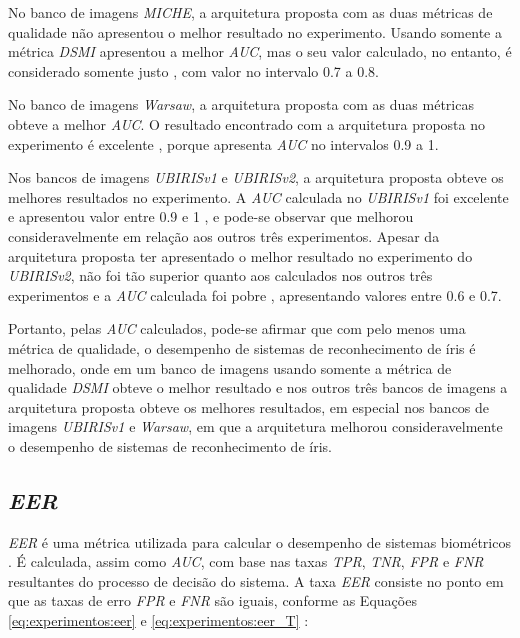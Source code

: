 \par No banco de imagens \textit{MICHE}, a arquitetura proposta com as duas métricas de qualidade não apresentou o melhor resultado no experimento. Usando somente a métrica \textit{\acrshort{DSMI}} apresentou a melhor \textit{\acrshort{AUC}}, mas o seu valor calculado, no entanto, é considerado somente justo \cite{aucROC}, com valor no intervalo 0.7 a 0.8.

\par No banco de imagens \textit{\acrshort{Warsaw}}, a arquitetura proposta com as duas métricas obteve a melhor \textit{\acrshort{AUC}}. O resultado encontrado com a arquitetura proposta no experimento é excelente \cite{aucROC}, porque apresenta \textit{\acrshort{AUC}} no intervalos 0.9 a 1.

\par Nos bancos de imagens \textit{UBIRISv1} e \textit{UBIRISv2}, a arquitetura proposta obteve os melhores resultados no experimento. A \textit{\acrshort{AUC}} calculada no \textit{UBIRISv1} foi excelente e apresentou valor entre 0.9 e 1 \cite{aucROC}, e pode-se observar que melhorou consideravelmente em relação aos outros três experimentos. Apesar da arquitetura proposta ter apresentado o melhor resultado no experimento do \textit{UBIRISv2}, não foi tão superior quanto aos calculados nos outros três experimentos e a \textit{\acrshort{AUC}} calculada foi pobre \cite{aucROC}, apresentando valores entre 0.6 e 0.7.

\par Portanto, pelas \textit{\acrshort{AUC}} calculados, pode-se afirmar que com pelo menos uma métrica de qualidade, o desempenho de sistemas de reconhecimento de íris é melhorado, onde em um banco de imagens usando somente a métrica de qualidade \textit{\acrshort{DSMI}} obteve o melhor resultado e nos outros três bancos de imagens a arquitetura proposta obteve os melhores resultados, em especial nos bancos de imagens \textit{UBIRISv1} e \textit{\acrshort{Warsaw}}, em que a arquitetura melhorou consideravelmente o desempenho de sistemas de reconhecimento de íris. 

\FloatBarrier

\subsection{\textit{\acrfull{EER}}} \label{sec:experimentos:eer}

\par \textit{\acrshort{EER}} é uma métrica utilizada para calcular o desempenho de sistemas biométricos \cite{eer}. É calculada, assim como \textit{\acrshort{AUC}}, com base nas taxas \textit{\acrshort{TPR}}, \textit{\acrshort{TNR}}, \textit{\acrshort{FPR}} e \textit{\acrshort{FNR}} resultantes do processo de decisão do sistema. A taxa \textit{\acrshort{EER}} consiste no ponto em que as taxas de erro \textit{\acrshort{FPR}} e \textit{\acrshort{FNR}} são iguais, conforme as Equações \ref{eq:experimentos:eer} e \ref{eq:experimentos:eer_T} \cite{d33BEAT}:

